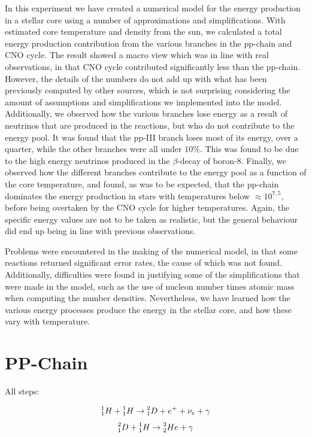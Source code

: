 \documentclass[a4paper,10pt,english]{article}
\newcommand{\Hh}{\prescript{1}{1}{H}}
\begin{document}
In this experiment we have created a numerical model for the energy production in a stellar core using a number of approximations and simplifications. With estimated core temperature and density from the sun, we calculated a total energy production contribution from the various branches in the pp-chain and CNO cycle. The result showed a macro view which was in line with real observations, in that CNO cycle contributed significantly less than the pp-chain. However, the details of the numbers do not add up with what has been previously computed by other sources, which is not surprising considering the amount of assumptions and simplifications we implemented into the model. Additionally, we observed how the various branches lose energy as a result of neutrinos that are produced in the reactions, but who do not contribute to the energy pool. It was found that the pp-III branch loses most of its energy, over a quarter, while the other branches were all under $10\%$. This was found to be due to the high energy neutrinos produced in the $\beta$-decay of boron-8. Finally, we observed how the different branches contribute to the energy pool as a function of the core temperature, and found, as was to be expected, that the pp-chain dominates the energy production in stars with temperatures below $\approx 10^{7,5}$, before being overtaken by the CNO cycle for higher temperatures. Again, the specific energy values are not to be taken as realistic, but the general behaviour did end up being in line with previous observations. 

Problems were encountered in the making of the numerical model, in that some reactions returned significant error rates, the cause of which was not found. Additionally, difficulties were found in justifying some of the simplifications that were made in the model, such as the use of nucleon number times atomic mass when computing the number densities. Nevertheless, we have learned how the various energy processes produce the energy in the stellar core, and how these vary with temperature.


\newpage

\appendix

\section{PP-Chain} \label{appendix:PP}

All steps:

$$\Hh + \Hh \rightarrow \prescript{2}{1}{D} + e^+ + \nu_e + \gamma$$
$$\prescript{2}{1}{D} + \Hh \rightarrow \prescript{3}{2}{He} + \gamma$$
\end{document}
